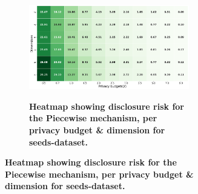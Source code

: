 \begin{figure}[H]
\begin{subfigure}[b]{0.85\textwidth}
        \begin{subfigure}[c]{1\textwidth}
            \caption{\textbf{Heatmap showing disclosure risk for the Piecewise mechanism, per privacy budget \& dimension for seeds-dataset.}}
            \includegraphics[width=1\textwidth]{Results/kd-laplace/piecewise/seeds-dataset/distance.png}
            \label{fig:privacy_dist_seeds-dataset_adversial_advantage_piecewise}
        \end{subfigure}
    \end{subfigure}
    \hfill %
    \begin{subfigure}[b]{0.075\textwidth}

\end{subfigure}
\end{figure}
